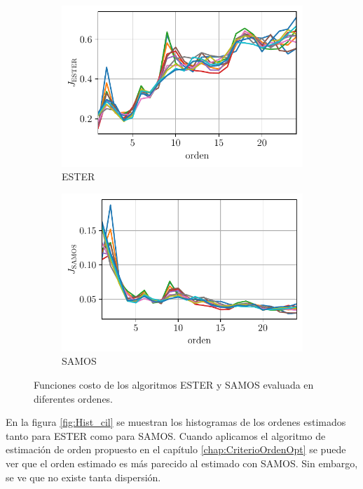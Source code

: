         \begin{figure}[ht]
            \centering
           \begin{subfigure}{0.4\linewidth}
			\centering
			\includegraphics[width = \linewidth]{Figuras/J_ester_UWB.pdf}
			\caption{ESTER}
		\end{subfigure}
        \begin{subfigure}{0.4\linewidth}
			\centering
			\includegraphics[width = \linewidth]{Figuras/J_samos_UWB.pdf}
			\caption{SAMOS}
		\end{subfigure}
        \caption{Funciones costo de los algoritmos ESTER y SAMOS evaluada en diferentes ordenes.}
        \label{Fig:EsterSamos_cil}    
        \end{figure}

     En la figura \ref{fig:Hist_cil} se muestran los histogramas de los ordenes estimados tanto para ESTER como para SAMOS. Cuando aplicamos el algoritmo de estimación de orden propuesto en el capítulo \ref{chap:CriterioOrdenOpt} se puede ver que el orden estimado es más parecido al estimado con SAMOS. Sin embargo, se ve que no existe tanta dispersión. 

